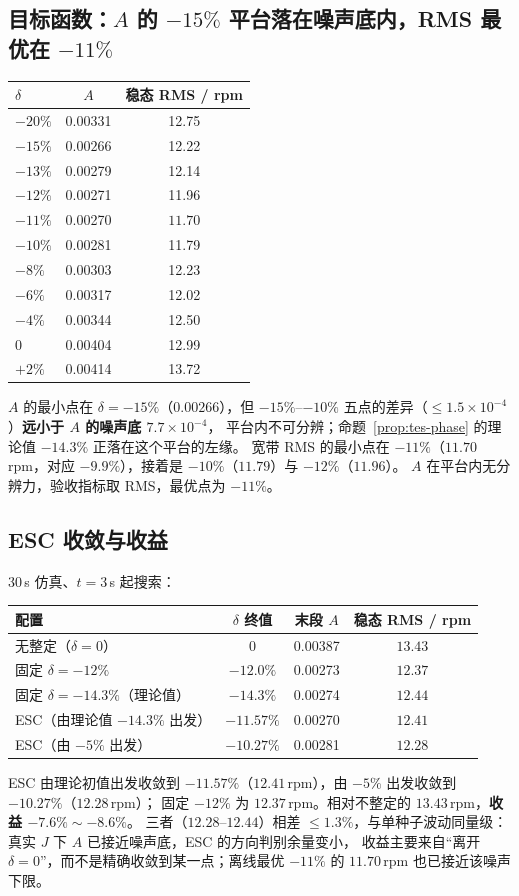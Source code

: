 \documentclass[11pt,a4paper]{article}
\theoremstyle{remark}\newtheorem{remark}{注}
\begin{document}
\subsection{目标函数：$A$ 的 $-15\%$ 平台落在噪声底内，RMS 最优在 $-11\%$}\label{sec:tes-res-opt}
\begin{center}\footnotesize
\begin{tabular}{@{}lcc@{}}
\toprule
$\delta$ & $A$ & 稳态 RMS / rpm\\
\midrule
$-20\%$ & 0.00331 & 12.75\\
$-15\%$ & $\mathbf{0.00266}$ & 12.22\\
$-13\%$ & 0.00279 & 12.14\\
$-12\%$ & 0.00271 & 11.96\\
$-11\%$ & 0.00270 & $\mathbf{11.70}$\\
$-10\%$ & 0.00281 & 11.79\\
$-8\%$ & 0.00303 & 12.23\\
$-6\%$ & 0.00317 & 12.02\\
$-4\%$ & 0.00344 & 12.50\\
$0$ & 0.00404 & 12.99\\
$+2\%$ & 0.00414 & 13.72\\
\bottomrule
\end{tabular}
\end{center}
$A$ 的最小点在 $\delta=-15\%$（$0.00266$），但 $-15\%$--$-10\%$ 五点的差异（$\le1.5\times10^{-4}$）\textbf{远小于 $A$ 的噪声底 $7.7\times10^{-4}$}，
平台内不可分辨；命题~\ref{prop:tes-phase} 的理论值 $-14.3\%$ 正落在这个平台的左缘。
宽带 RMS 的最小点在 $-11\%$（$11.70$\,rpm，对应 $-9.9\%$），接着是 $-10\%$（$11.79$）与 $-12\%$（$11.96$）。
$A$ 在平台内无分辨力，验收指标取 RMS，最优点为 $-11\%$。

\subsection{ESC 收敛与收益}\label{sec:tes-res-esc}
30\,s 仿真、$t=3$\,s 起搜索：
\begin{center}\footnotesize
\begin{tabular}{@{}lccc@{}}
\toprule
配置 & $\delta$ 终值 & 末段 $A$ & 稳态 RMS / rpm\\
\midrule
无整定（$\delta=0$） & $0$ & 0.00387 & $13.43$\\
固定 $\delta=-12\%$ & $-12.0\%$ & 0.00273 & $12.37$\\
固定 $\delta=-14.3\%$（理论值） & $-14.3\%$ & 0.00274 & $12.44$\\
ESC（由理论值 $-14.3\%$ 出发） & $-11.57\%$ & 0.00270 & $12.41$\\
ESC（由 $-5\%$ 出发） & $-10.27\%$ & 0.00281 & $12.28$\\
\bottomrule
\end{tabular}
\end{center}
ESC 由理论初值出发收敛到 $-11.57\%$（$12.41$\,rpm），由 $-5\%$ 出发收敛到 $-10.27\%$（$12.28$\,rpm）；
固定 $-12\%$ 为 $12.37$\,rpm。相对不整定的 $13.43$\,rpm，\textbf{收益 $-7.6\%\sim-8.6\%$}。
三者（$12.28$--$12.44$）相差 $\le1.3\%$，与单种子波动同量级：真实 $J$ 下 $A$ 已接近噪声底，ESC 的方向判别余量变小，
收益主要来自“离开 $\delta=0$”，而不是精确收敛到某一点；离线最优 $-11\%$ 的 $11.70$\,rpm 也已接近该噪声下限。
\end{document}
